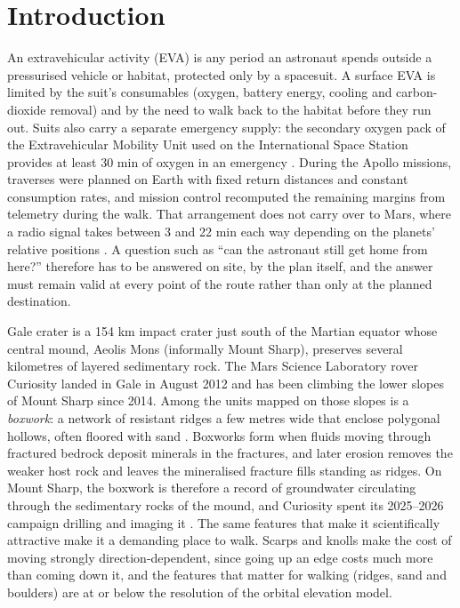 \documentclass[11pt,a4paper]{article}
\begin{document}
\section{Introduction}

An extravehicular activity (EVA) is any period an astronaut spends outside a pressurised vehicle or habitat, protected only by a spacesuit. A surface EVA is limited by the suit's consumables (oxygen, battery energy, cooling and carbon-dioxide removal) and by the need to walk back to the habitat before they run out. Suits also carry a separate emergency supply: the secondary oxygen pack of the Extravehicular Mobility Unit used on the International Space Station provides at least 30 min of oxygen in an emergency \cite{NASA-EMU}. During the Apollo missions, traverses were planned on Earth with fixed return distances and constant consumption rates, and mission control recomputed the remaining margins from telemetry during the walk. That arrangement does not carry over to Mars, where a radio signal takes between 3 and 22 min each way depending on the planets' relative positions \cite{NASA-MarsFact}. A question such as ``can the astronaut still get home from here?'' therefore has to be answered on site, by the plan itself, and the answer must remain valid at every point of the route rather than only at the planned destination.

Gale crater is a 154 km impact crater just south of the Martian equator whose central mound, Aeolis Mons (informally Mount Sharp), preserves several kilometres of layered sedimentary rock. The Mars Science Laboratory rover Curiosity landed in Gale in August 2012 and has been climbing the lower slopes of Mount Sharp since 2014. Among the units mapped on those slopes is a \emph{boxwork}: a network of resistant ridges a few metres wide that enclose polygonal hollows, often floored with sand \cite{Siebach2014}. Boxworks form when fluids moving through fractured bedrock deposit minerals in the fractures, and later erosion removes the weaker host rock and leaves the mineralised fracture fills standing as ridges. On Mount Sharp, the boxwork is therefore a record of groundwater circulating through the sedimentary rocks of the mound, and Curiosity spent its 2025--2026 campaign drilling and imaging it \cite{Siebach2026,JPL2026,NASA-blog-4804,Hausrath2026}. The same features that make it scientifically attractive make it a demanding place to walk. Scarps and knolls make the cost of moving strongly direction-dependent, since going up an edge costs much more than coming down it, and the features that matter for walking (ridges, sand and boulders) are at or below the resolution of the orbital elevation model.
\end{document}
